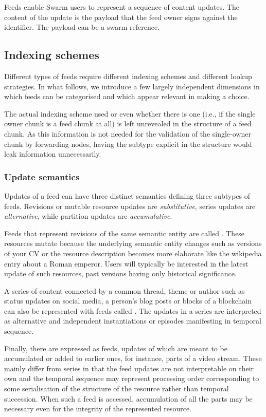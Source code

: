 Feeds enable Swarm users to represent a sequence of content updates. The content of  the update is the payload that the feed owner signs against the identifier. The payload can be a swarm reference.

\subsection{Indexing schemes \statusyellow}\label{sec:indexing-schemes}

Different types of feeds require different indexing schemes and different lookup strategies. In what follows, we introduce a few largely independent dimensions in which feeds can be categorised and which appear relevant in making a choice.


The actual indexing scheme used or even whether there is one (i.e., if the single owner chunk is a feed chunk at all) is left unrevealed in the structure of a feed chunk. As this information is not needed for the validation of the single-owner chunk by forwarding nodes, having the subtype explicit in the structure would leak  information unnecessarily. 

\subsubsection{Update semantics}

Updates of a feed can have three distinct semantics defining three subtypes of feeds. 
Revisions or mutable resource updates are \emph{substitutive}, series updates are \emph{alternative}, while partition updates are \emph{accumulative}. 

Feeds that represent revisions of the same semantic entity are called . These resources mutate because the underlying semantic entity changes such as versions of your CV or the resource description becomes more elaborate like the wikipedia entry about a Roman emperor. Users will typically be interested in the latest update of such resources, past versions having only historical significance. 

A series of content connected by a common thread, theme or author such as status updates on social media, a person's blog posts or blocks of a blockchain can also be represented with feeds called .
The updates in a series are interpreted as alternative and independent instantiations or episodes manifesting in temporal sequence. 

Finally, there are  expressed as feeds, updates of which are meant to be accumulated or added to earlier ones, for instance, parts of a video stream. These mainly differ from series in that the feed updates are not interpretable on their own and the temporal sequence may represent processing order corresponding to some serialisation of the structure of the resource rather than temporal succession. When such a feed is accessed, accumulation of all the parts may be necessary even for the integrity of the represented resource.


